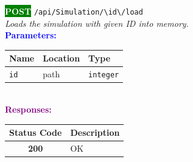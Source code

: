 \begin{tcolorbox}[
    colback=green!5,
    colframe=green,
    arc=2mm,
    boxrule=1pt,
    left=5pt,
    right=5pt,
    top=5pt,
    bottom=5pt
]
\noindent\colorbox{green}{\textcolor{white}{\textbf{POST}}} 
\texttt{\large /api/Simulation/\textbackslash{}{id\textbackslash{}}/load}\\[0.3em]
\textit{Loads the simulation with given ID into memory.}\\[0.3em]
\vspace{0.3em}
\textbf{\textcolor{blue}{Parameters:}}\\[0.2em]
\begin{tabular}{|l|l|l|}
\hline
\rowcolor{gray!20}
\textbf{Name} & \textbf{Location} & \textbf{Type} \\ \hline
\texttt{id} & path & \texttt{integer} \\ \hline
\end{tabular}\\[0.5em]
\vspace{0.3em}
\textbf{\textcolor{purple}{Responses:}}\\[0.2em]
\begin{tabular}{|c|p{10cm}|}
\hline
\rowcolor{gray!20}
\textbf{Status Code} & \textbf{Description} \\ \hline
\colorbox{green!20}{\textbf{200}} & OK \\ \hline
\end{tabular}
\end{tcolorbox}
\vspace{0.5em}


